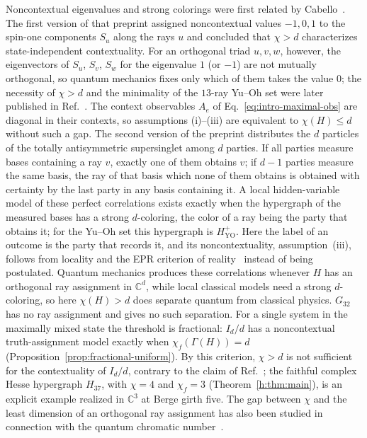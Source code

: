 \documentclass[aps,pra,reprint,superscriptaddress,longbibliography,nofootinbib,floatfix,10pt]{revtex4-2}
\theoremstyle{definition}\newtheorem{definition}[theorem]{Definition}
\theoremstyle{remark}\newtheorem{remark}[theorem]{Remark}
\newcommand{\C}{\mathbb C}\newcommand{\R}{\mathbb R}\newcommand{\Q}{\mathbb Q}
\newcommand{\YO}{\mathrm{YO}}\newcommand{\ip}[2]{\langle #1,#2\rangle}
\begin{document}
Noncontextual eigenvalues and strong colorings were first related by Cabello~\cite{cabello2012maxnonlocality}. The first version of that preprint assigned noncontextual values $-1,0,1$ to the spin-one components $S_u$ along the rays $u$ and concluded that $\chi>d$ characterizes state-independent contextuality. For an orthogonal triad $u,v,w$, however, the eigenvectors of $S_u$, $S_v$, $S_w$ for the eigenvalue $1$ (or $-1$) are not mutually orthogonal, so quantum mechanics fixes only which of them takes the value $0$; the necessity of $\chi>d$ and the minimality of the $13$-ray Yu--Oh set were later published in Ref.~\cite{cabello2015sic}. The context observables $A_e$ of Eq.~\eqref{eq:intro-maximal-obs} are diagonal in their contexts, so assumptions (i)--(iii) are equivalent to $\chi(H)\le d$ without such a gap. The second version of the preprint distributes the $d$ particles of the totally antisymmetric supersinglet among $d$ parties. If all parties measure bases containing a ray $v$, exactly one of them obtains $v$; if $d-1$ parties measure the same basis, the ray of that basis which none of them obtains is obtained with certainty by the last party in any basis containing it. A local hidden-variable model of these perfect correlations exists exactly when the hypergraph of the measured bases has a strong $d$-coloring, the color of a ray being the party that obtains it; for the Yu--Oh set this hypergraph is $H_{\YO}^{+}$. Here the label of an outcome is the party that records it, and its noncontextuality, assumption~(iii), follows from locality and the EPR criterion of reality~\cite{epr} instead of being postulated. Quantum mechanics produces these correlations whenever $H$ has an orthogonal ray assignment in $\C^d$, while local classical models need a strong $d$-coloring, so here $\chi(H)>d$ does separate quantum from classical physics. $G_{32}$ has no ray assignment and gives no such separation. For a single system in the maximally mixed state the threshold is fractional: $I_d/d$ has a noncontextual truth-assignment model exactly when $\chi_f(\Gamma(H))=d$~\cite{ramanathan2014sic} (Proposition~\ref{prop:fractional-uniform}). By this criterion, $\chi>d$ is not sufficient for the contextuality of $I_d/d$, contrary to the claim of Ref.~\cite{cabello2012maxnonlocality}; the faithful complex Hesse hypergraph $H_{37}$, with $\chi=4$ and $\chi_f=3$ (Theorem~\ref{h:thm:main}), is an explicit example realized in $\C^3$ at Berge girth five. The gap between $\chi$ and the least dimension of an orthogonal ray assignment has also been studied in connection with the quantum chromatic number~\cite{scarpa2012ks}.
\end{document}
